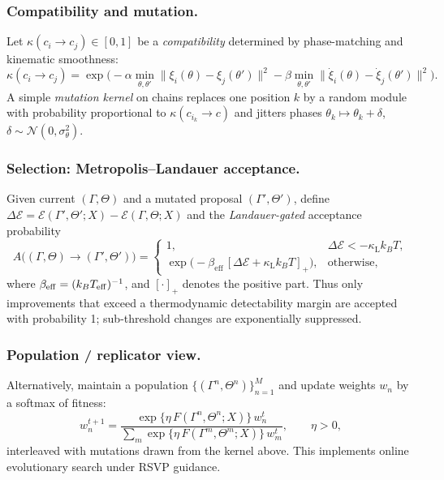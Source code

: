 \documentclass[a4paper,11pt]{article}
\begin{document}
\subsubsection{Compatibility and mutation.}
Let $\kappa(c_i\!\to\! c_j)\in[0,1]$ be a \emph{compatibility} determined by
phase-matching and kinematic smoothness:
\begin{equation}
\label{eq:compat}
\kappa(c_i\!\to\! c_j)
=
\exp\!\Big(
-\alpha \min_{\theta,\theta'} \|\xi_i(\theta)-\xi_j(\theta')\|^2
-\beta \min_{\theta,\theta'} \|\dot\xi_i(\theta)-\dot\xi_j(\theta')\|^2
\Big).
\end{equation}
A simple \emph{mutation kernel} on chains replaces one position $k$ by a
random module with probability proportional to $\kappa(c_{i_k}\!\to\! c)$
and jitters phases $\theta_k\mapsto \theta_k+\delta$, $\delta\sim \mathcal{N}(0,\sigma_\theta^2)$.

\subsubsection{Selection: Metropolis–Landauer acceptance.}
Given current $(\Gamma,\Theta)$ and a mutated proposal $(\Gamma',\Theta')$,
define $\Delta \mathcal{E}=\mathcal{E}(\Gamma',\Theta';X)-\mathcal{E}(\Gamma,\Theta;X)$
and the \emph{Landauer-gated} acceptance probability
\begin{equation}
\label{eq:metropolis-landauer}
A\big((\Gamma,\Theta)\!\to\!(\Gamma',\Theta')\big)
=
\begin{cases}
1, & \Delta \mathcal{E}< -\kappa_{\mathrm{L}} k_B T,\\[4pt]
\exp\!\Big(-\beta_{\mathrm{eff}}\,[\Delta \mathcal{E}+ \kappa_{\mathrm{L}} k_B T]_+\Big), & \text{otherwise,}
\end{cases}
\end{equation}
where $\beta_{\rm eff}=(k_B T_{\rm eff})^{-1}$, and $[\cdot]_+$ denotes the positive part.
Thus only improvements that exceed a thermodynamic detectability margin are
accepted with probability 1; sub-threshold changes are exponentially suppressed.

\subsubsection{Population / replicator view.}
Alternatively, maintain a population $\{(\Gamma^n,\Theta^n)\}_{n=1}^M$ and update
weights $w_n$ by a softmax of fitness:
\begin{equation}
\label{eq:replicator}
w_n^{t+1}
=
\frac{\exp\{\eta\,F(\Gamma^n,\Theta^n;X)\}\,w_n^t}{
\sum_m \exp\{\eta\,F(\Gamma^m,\Theta^m;X)\}\,w_m^t},
\qquad \eta>0,
\end{equation}
interleaved with mutations drawn from the kernel above. This implements
online evolutionary search under RSVP guidance.
\end{document}
